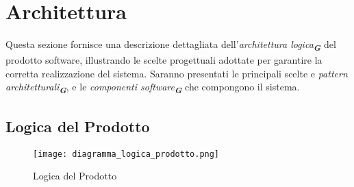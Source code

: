 
\section{Architettura}
\label{sec:architettura}

Questa sezione fornisce una descrizione dettagliata dell'\emph{architettura logica}\textsubscript{\textbf{\textit{G}}} del prodotto software, illustrando le scelte progettuali adottate per garantire la corretta realizzazione del sistema. Saranno presentati le principali scelte e \emph{pattern architetturali}\textsubscript{\textbf{\textit{G}}}, e le \emph{componenti software}\textsubscript{\textbf{\textit{G}}} che compongono il sistema.

\subsection{Logica del Prodotto}
\label{sec:logica_prodotto}

\begin{figure}[h]
    \centering
    \texttt{[image: diagramma\_logica\_prodotto.png]}
    \caption{Logica del Prodotto}
\end{figure}

